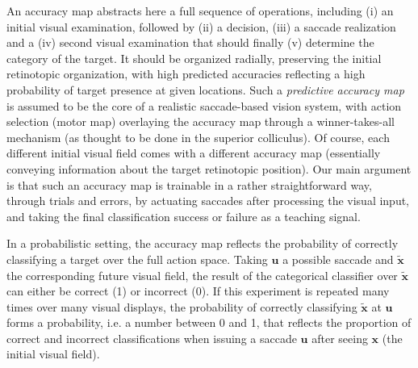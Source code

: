 An accuracy map abstracts here a full sequence of operations, including (i) an initial visual examination, followed by (ii) a decision, (iii) a saccade realization and a (iv) second visual examination that should finally (v) determine the category of the target. 
It should be organized radially, preserving the initial retinotopic organization, with high predicted accuracies reflecting a high probability of target presence at given locations. 
Such  a \emph{predictive accuracy map} is assumed to be the core of
a realistic saccade-based vision system, with action selection (motor map) overlaying the accuracy map through a winner-takes-all mechanism (as thought to be done in the superior colliculus). Of course, each different initial visual field comes with a different accuracy map (essentially conveying information about the target retinotopic position).
Our main argument is that such an accuracy map is trainable in a rather straightforward way, through trials and errors, by actuating saccades after processing the visual input, and taking the final classification success or failure as a teaching signal. 
\fi

\CNS In a probabilistic setting, the accuracy map reflects the probability of correctly classifying a target over the full action space. Taking $\boldsymbol{u}$ a possible saccade and $\tilde{\boldsymbol{x}}$ the corresponding future visual field, the result of the categorical classifier over $\tilde{\boldsymbol{x}}$ can either be correct (1) or incorrect (0). If this experiment is repeated many times over many visual displays, the probability of correctly classifying $\tilde{\boldsymbol{x}}$ at $\boldsymbol{u}$ forms a probability, i.e. a number between 0 and 1, that reflects the proportion of correct and incorrect classifications when issuing a saccade $\boldsymbol{u}$ after seeing $\boldsymbol{x}$ (the initial visual field). 
\fi

